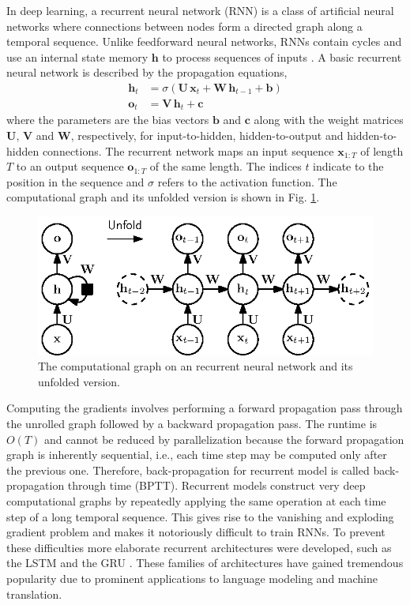 \documentclass{scrartcl}
\begin{document}
In deep learning, a recurrent neural network (RNN) \cite{Rumelhart1988} is a class of artificial neural networks where connections between nodes form a directed graph along a temporal sequence. Unlike feedforward neural networks, RNNs contain cycles and use an internal state memory $\mathbf h$ to process sequences of inputs \cite{Elman1990}. A basic recurrent neural network is described by the propagation equations,
\begin{align}
\mathbf h_t &= \sigma (\mathbf U \,\mathbf x_t + \mathbf W \, \mathbf h_{t-1} + \mathbf b) \\
\mathbf o_t &= \mathbf V \, \mathbf h_t + \mathbf c 
\end{align} 
where the parameters are the bias vectors $\mathbf b$ and $\mathbf c$ along with the weight matrices $\mathbf U$, $\mathbf V$ and $\mathbf W$, respectively, for input-to-hidden, hidden-to-output and hidden-to-hidden connections. The recurrent network maps an input sequence $\mathbf x_{1:T}$ of length $T$ to an output sequence $\mathbf o_{1:T}$ of the same length. The indices $t$ indicate to the position in the sequence and $\sigma$ refers to the activation function.  The computational graph and its unfolded version is shown in Fig. \ref{fig:rnn}.
\begin{figure}[htbp]
\centering
\includegraphics[scale=1]{figures/rnn.eps}
\caption{The computational graph on an recurrent neural network and its unfolded version.}
\label{fig:rnn}
\end{figure}    

Computing the gradients involves performing a forward propagation pass through the unrolled graph followed by a backward propagation pass. The runtime is $O(T)$ and cannot be reduced by parallelization because the forward propagation graph is inherently sequential, i.e., each time step may be computed only after the previous one. Therefore, back-propagation for recurrent model is called back-propagation through time (BPTT). Recurrent models construct very deep computational graphs by repeatedly applying the same operation at each time step of a long temporal sequence. This gives rise to the vanishing and exploding gradient problem and makes it notoriously difficult to train RNNs. To prevent these difficulties more elaborate recurrent architectures were developed, such as the LSTM \cite{Hochreiter1997} and the GRU \cite{Cho2014}. These families of architectures have gained tremendous popularity due to prominent applications to language modeling and machine translation. 
\end{document}

